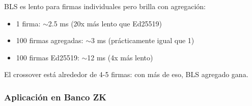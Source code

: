 \documentclass[11pt,a4paper,twoside,openright]{book}
\theoremstyle{definition}
\theoremstyle{plain}
\theoremstyle{remark}
\begin{document}
\begin{keyidea}
BLS es lento para firmas individuales pero brilla con agregación:
\begin{itemize}
    \item 1 firma: $\sim$2.5 ms (20x más lento que Ed25519)
    \item 100 firmas agregadas: $\sim$3 ms (prácticamente igual que 1)
    \item 100 firmas Ed25519: $\sim$12 ms (4x más lento)
\end{itemize}

El crossover está alrededor de 4-5 firmas: con más de eso, BLS agregado gana.
\end{keyidea}

\subsubsection{Aplicación en Banco ZK}
\end{document}
